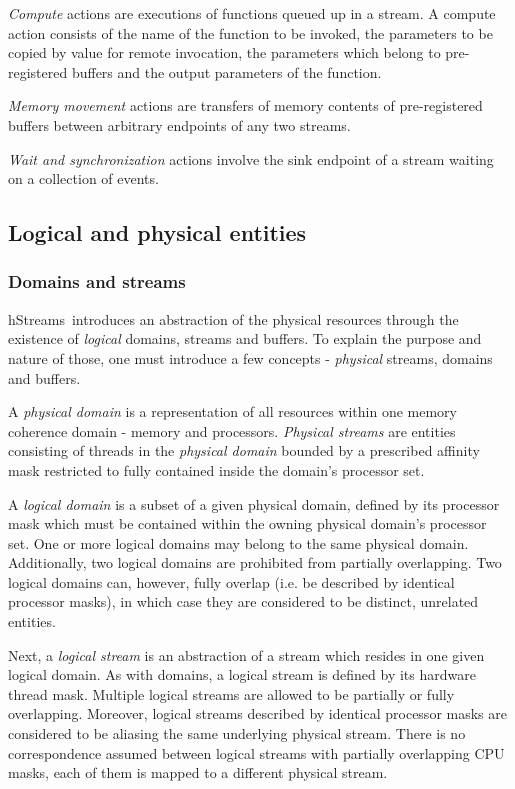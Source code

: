 \documentclass[a4,oneside]{book}
\newcommand{\hstreams}{hStreams}
\begin{document}
\emph{Compute} actions are executions of functions queued up in a stream.
A compute action consists of the name of the function to be invoked, the parameters to be copied by value for remote invocation, the parameters which belong to pre-registered buffers and the output parameters of the function.

\emph{Memory movement} actions are transfers of memory contents of pre-registered buffers between arbitrary endpoints of any two streams.

\emph{Wait and synchronization} actions involve the sink endpoint of a stream waiting on a collection of events.

\subsection{Logical and physical entities}
\subsubsection{Domains and streams}
\hstreams\ introduces an abstraction of the physical resources through the existence of \emph{logical} domains, streams and buffers.
To explain the purpose and nature of those, one must introduce a few concepts - \emph{physical} streams, domains and buffers.

A \emph{physical domain} is a representation of all resources within one memory coherence domain - memory and processors.
\emph{Physical streams} are entities consisting of threads in the \emph{physical domain} bounded by a prescribed affinity mask restricted to fully contained inside the domain's processor set.

A \emph{logical domain} is a subset of a given physical domain, defined by its processor mask which must be contained within the owning physical domain's processor set.
One or more logical domains may belong to the same physical domain.
Additionally, two logical domains are prohibited from partially overlapping.
Two logical domains can, however, fully overlap (i.e. be described by identical processor masks), in which case they are considered to be distinct, unrelated entities.

Next, a \emph{logical stream} is an abstraction of a stream which resides in one given logical domain.
As with domains, a logical stream is defined by its hardware thread mask.
Multiple logical streams are allowed to be partially or fully overlapping.
Moreover, logical streams described by identical processor masks are considered to be aliasing the same underlying physical stream.
There is no correspondence assumed between logical streams with partially overlapping CPU masks, each of them is mapped to a different physical stream.
\end{document}
